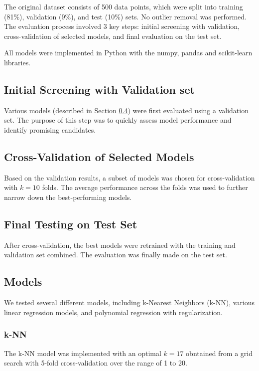 \documentclass[twocolumn]{article}
\begin{document}
The original dataset consists of 500 data points, which were split into training (81\%), 
validation (9\%), and test (10\%) sets. No outlier removal was performed. The evaluation process involved 3 key steps: 
initial screening with validation, cross-validation of selected models, and final evaluation on the test set.

All models were implemented in Python with the numpy, pandas and scikit-learn libraries.

\subsection{Initial Screening with Validation set}
Various models (described in Section \ref{sec:models}) were first evaluated using a validation set. 
The purpose of this step was to quickly assess model performance and identify promising candidates.

\subsection{Cross-Validation of Selected Models}
Based on the validation results, a subset of models was chosen for cross-validation with
\( k = 10 \) folds. The average performance across the folds was used to further narrow down the best-performing models.

\subsection{Final Testing on Test Set}
After cross-validation, the best models were retrained with the training and validation set combined. 
The evaluation was finally made on the test set.



\subsection{Models}\label{sec:models}

We tested several different models, including k-Nearest Neighbors (k-NN), 
various linear regression models, and polynomial regression with regularization.

\subsubsection{k-NN}
The k-NN model was implemented with an optimal \( k = 17\) obntained from a grid search with 5-fold cross-validation 
over the range of 1 to 20.
\end{document}
